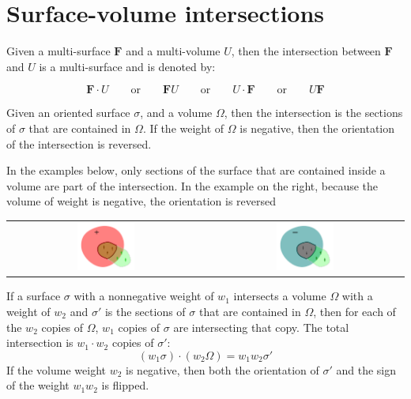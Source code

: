\documentclass{book}
\begin{document}
\section{Surface-volume intersections} 

Given a multi-surface \(\mathbf{F}\) and a multi-volume \(U\), then the intersection between \(\mathbf{F}\) and \(U\) is a multi-surface and is denoted by:

\[\mathbf{F} \cdot U \quad\quad\text{or}\quad\quad \mathbf{F} U \quad\quad\text{or}\quad\quad U \cdot \mathbf{F} \quad\quad\text{or}\quad\quad U \mathbf{F}\]

Given an oriented surface \(\sigma\), and a volume \(\Omega\), then the intersection is the sections of \(\sigma\) that are contained in \(\Omega\). If the weight of \(\Omega\) is negative, then the orientation of the intersection is reversed.  

In the examples below, only sections of the surface that are contained inside a volume are part of the intersection. In the example on the right, because the volume of weight is negative, the orientation is reversed

\begin{center}
\begin{tabular}{cc}
\includegraphics[width = 0.3\textwidth]{Intersections/Surface-volume_intersections/surface_volume_intersections_example_1}
& 
\includegraphics[width = 0.3\textwidth]{Intersections/Surface-volume_intersections/surface_volume_intersections_example_2}
\end{tabular}
\end{center}

If a surface \(\sigma\) with a nonnegative weight of \(w_1\) intersects a volume \(\Omega\) with a weight of \(w_2\) and \(\sigma'\) is the sections of \(\sigma\) that are contained in \(\Omega\), then for each of the \(w_2\) copies of \(\Omega\), \(w_1\) copies of \(\sigma\) are intersecting that copy. The total intersection is \(w_1 \cdot w_2\) copies of \(\sigma'\):
\[(w_1 \sigma) \cdot (w_2 \Omega) = w_1 w_2 \sigma'\] 
If the volume weight \(w_2\) is negative, then both the orientation of \(\sigma'\) and the sign of the weight \(w_1 w_2\) is flipped. 
\end{document}
